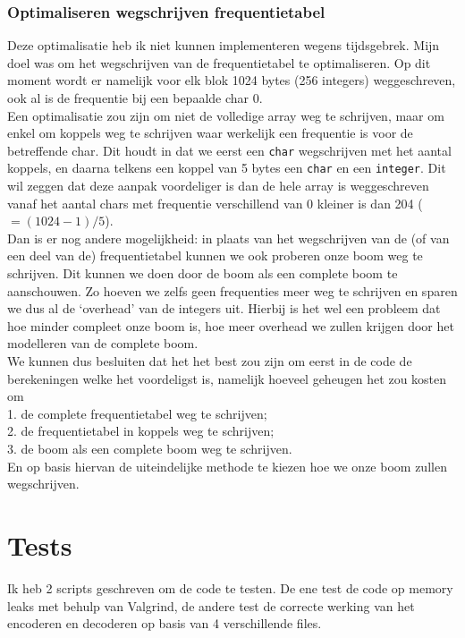\documentclass[11pt,a4paper]{article}
\begin{document}
\subsubsection*{Optimaliseren wegschrijven frequentietabel}
Deze optimalisatie heb ik niet kunnen implementeren wegens tijdsgebrek. Mijn doel was om het wegschrijven van de frequentietabel te optimaliseren. Op dit moment wordt er namelijk voor elk blok 1024 bytes (256 integers) weggeschreven, ook al is de frequentie bij een bepaalde char 0. \\
Een optimalisatie zou zijn om niet de volledige array weg te schrijven, maar om enkel om koppels weg te schrijven waar werkelijk een frequentie is voor de betreffende char. Dit houdt in dat we eerst een \texttt{char} wegschrijven met het aantal koppels, en daarna telkens een koppel van 5 bytes een \texttt{char} en een \texttt{integer}. Dit wil zeggen dat deze aanpak voordeliger is dan de hele array is weggeschreven vanaf het aantal chars met frequentie verschillend van 0 kleiner is dan 204 ($=(1024-1)/5$).\\
Dan is er nog andere mogelijkheid: in plaats van het wegschrijven van de (of van een deel van de) frequentietabel kunnen we ook proberen onze boom weg te schrijven. Dit kunnen we doen door de boom als een complete boom te aanschouwen. Zo hoeven we zelfs geen frequenties meer weg te schrijven en sparen we dus al de `overhead' van de integers uit. Hierbij is het wel een probleem dat hoe minder compleet onze boom is, hoe meer overhead we zullen krijgen door het modelleren van de complete boom.\\
We kunnen dus besluiten dat het het best zou zijn om eerst in de code de berekeningen welke het voordeligst is, namelijk hoeveel geheugen het zou kosten om \\
1. de complete frequentietabel weg te schrijven;\\
2. de frequentietabel in koppels weg te schrijven;\\
3. de boom als een complete boom weg te schrijven.\\
En op basis hiervan de uiteindelijke methode te kiezen hoe we onze boom zullen wegschrijven.

\section{Tests}
Ik heb 2 scripts geschreven om de code te testen. De ene test de code op memory leaks met behulp van Valgrind, de andere test de correcte werking van het encoderen en decoderen op basis van 4 verschillende files.
\end{document}
